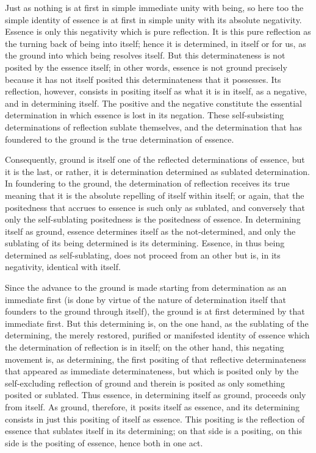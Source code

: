 Just as nothing is at first
in simple immediate unity with being,
so here too the simple identity of essence is
at first in simple unity with its absolute negativity.
Essence is only this negativity which is pure reflection.
It is this pure reflection as
the turning back of being into itself;
hence it is determined, in itself or for us,
as the ground into which being resolves itself.
But this determinateness is not posited by the essence itself;
in other words, essence is not ground precisely because
it has not itself posited this determinateness that it possesses.
Its reflection, however, consists in positing itself as
what it is in itself, as a negative, and in determining itself.
The positive and the negative constitute the essential determination
in which essence is lost in its negation.
These self-subsisting determinations of reflection sublate themselves,
and the determination that has foundered to the ground is
the true determination of essence.

Consequently, ground is itself one of
the reflected determinations of essence,
but it is the last, or rather,
it is determination determined as sublated determination.
In foundering to the ground, the determination of reflection
receives its true meaning that it is the
absolute repelling of itself within itself;
or again, that the positedness that accrues to essence is
such only as sublated,
and conversely that only the self-sublating positedness is
the positedness of essence.
In determining itself as ground,
essence determines itself as the not-determined,
and only the sublating of its being determined is its determining.
Essence, in thus being determined as self-sublating,
does not proceed from an other but is,
in its negativity, identical with itself.

Since the advance to the ground is made starting
from determination as an immediate first
(is done by virtue of the nature of determination itself
that founders to the ground through itself),
the ground is at first determined by that immediate first.
But this determining is, on the one hand,
as the sublating of the determining,
the merely restored, purified or manifested identity of essence
which the determination of reflection is in itself;
on the other hand, this negating movement is, as determining,
the first positing of that reflective determinateness
that appeared as immediate determinateness,
but which is posited only by the self-excluding reflection of ground
and therein is posited as only something posited or sublated.
Thus essence, in determining itself as ground, proceeds only from itself.
As ground, therefore, it posits itself as essence,
and its determining consists in just this positing of itself as essence.
This positing is the reflection of essence
that sublates itself in its determining;
on that side is a positing, on this side is the positing of essence,
hence both in one act.


